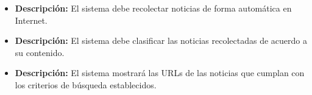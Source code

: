 
    \begin{itemize}
      \item \textbf{Descripción:} El sistema debe recolectar noticias de forma automática en Internet.\\
    \end{itemize}
    \begin{itemize}
      \item \textbf{Descripción:} El sistema debe clasificar las noticias recolectadas de acuerdo a su contenido.\\
    \end{itemize}
    \begin{itemize}
      \item \textbf{Descripción:} El sistema mostrará las URLs de las noticias que cumplan con los criterios de búsqueda establecidos.\\
    \end{itemize}
